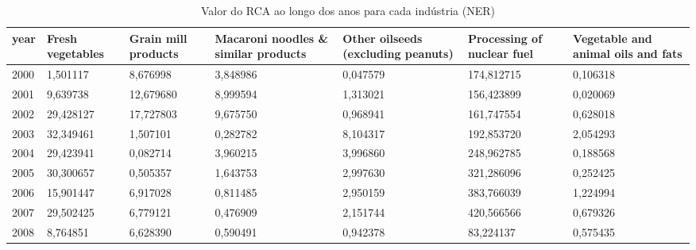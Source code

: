 \begin{table}
\centering
\caption{Valor do RCA ao longo dos anos para cada indústria (NER)}
\begin{tabular}{p{1cm}p{2cm}p{2cm}p{2cm}p{2cm}p{2cm}p{2cm}}
\toprule
 year &  Fresh vegetables &  Grain mill products &  Macaroni noodles \& similar products &  Other oilseeds (excluding peanuts) &  Processing of nuclear fuel &  Vegetable and animal oils and fats \\
\midrule
 2000 &          1,501117 &             8,676998 &                             3,848986 &                            0,047579 &                  174,812715 &                            0,106318 \\
 2001 &          9,639738 &            12,679680 &                             8,999594 &                            1,313021 &                  156,423899 &                            0,020069 \\
 2002 &         29,428127 &            17,727803 &                             9,675750 &                            0,968941 &                  161,747554 &                            0,628018 \\
 2003 &         32,349461 &             1,507101 &                             0,282782 &                            8,104317 &                  192,853720 &                            2,054293 \\
 2004 &         29,423941 &             0,082714 &                             3,960215 &                            3,996860 &                  248,962785 &                            0,188568 \\
 2005 &         30,300657 &             0,505357 &                             1,643753 &                            2,997630 &                  321,286096 &                            0,252425 \\
 2006 &         15,901447 &             6,917028 &                             0,811485 &                            2,950159 &                  383,766039 &                            1,224994 \\
 2007 &         29,502425 &             6,779121 &                             0,476909 &                            2,151744 &                  420,566566 &                            0,679326 \\
 2008 &          8,764851 &             6,628390 &                             0,590491 &                            0,942378 &                   83,224137 &                            0,575435 \\

\end{tabular}
\end{table}
